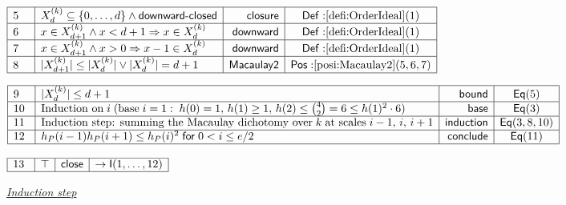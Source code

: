 \documentclass[11pt,reqno]{amsart}
\begin{document}
\nointerlineskip\noindent$%
\begin{array}{|m{0.5cm}|l|r|c|}
\hline
5 & X_{d}^{(k)}\subseteq\{0,\dots,d\}\wedge\mathsf{downward\text{-}closed} & 
\mathsf{closure} & \mathsf{Def:}\ref{defi:OrderIdeal}(1) \\ \hline
6 & x\in X_{d+1}^{(k)}\wedge x<d+1\Rightarrow x\in X_{d}^{(k)} & \mathsf{%
downward} & \mathsf{Def:}\ref{defi:OrderIdeal}(1) \\ \hline
7 & x\in X_{d+1}^{(k)}\wedge x>0\Rightarrow x-1\in X_{d}^{(k)} & \mathsf{%
downward} & \mathsf{Def:}\ref{defi:OrderIdeal}(1) \\ \hline
8 & |X_{d+1}^{(k)}|\le|X_{d}^{(k)}|\vee|X_{d}^{(k)}|=d+1 & \mathsf{Macaulay2}
& \mathsf{Pos:}\ref{posi:Macaulay2}(5,6,7) \\ \hline
\end{array}%
$

\nointerlineskip\noindent$%
\begin{array}{|m{0.5cm}|l|r|c|}
\hline
9 & |X_{d}^{(k)}|\le d+1 & \mathsf{bound} & \mathsf{Eq}(5) \\ \hline
10 & \text{Induction on}\;i\;(\text{base}\;i=1:\;h(0)=1,\,h(1)\ge 1,\,h(2)\le%
\binom{4}{2}=6\le h(1)^{2}\cdot 6) & \mathsf{base} & \mathsf{Eq}(3) \\ \hline
11 & \text{Induction step: summing the Macaulay dichotomy over}\;k\;\text{at
scales}\;i-1,\,i,\,i+1 & \mathsf{induction} & \mathsf{Eq}(3,8,10) \\ \hline
12 & h_{P}(i-1)h_{P}(i+1)\le h_{P}(i)^{2}\;\mathsf{for}\;0<i\le e/2 & 
\mathsf{conclude} & \mathsf{Eq}(11) \\ \hline
\end{array}%
$

\nointerlineskip\noindent $%
\begin{array}{|m{0.5cm}|l|r|c|}
\hline
13 & \top  & \mathsf{close} & \rightarrow \mathsf{I}(1,\dots ,12) \\ \hline
\end{array}%
$

\bigskip 

\medskip%

\medskip \underline{\noindent \textit{Induction step}}

\bigskip 
\medskip%
\end{document}
